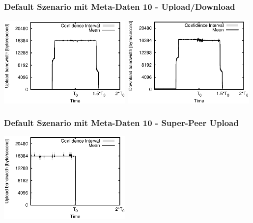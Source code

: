 \begin{frame}
  \frametitle{Default Szenario mit Meta-Daten 10 - Upload/Download}
  \begin{center}
    \includegraphics[width=0.49\textwidth]{fig/plots/scenario_10_meta_data_10/plots/GeneratedMeanCurrentUploadBandwidth.csv.eps}
    \includegraphics[width=0.49\textwidth]{fig/plots/scenario_10_meta_data_10/plots/GeneratedMeanCurrentDownloadBandwidth.csv.eps}
  \end{center}
\end{frame}


\begin{frame}
  \frametitle{Default Szenario mit Meta-Daten 10 - Super-Peer Upload}
  \begin{center}
    \includegraphics[width=0.49\textwidth]{fig/plots/scenario_10_meta_data_10/plots/GeneratedMeanCurrentSuperSeederUploadBandwidth.csv.eps}
  \end{center}
\end{frame}



